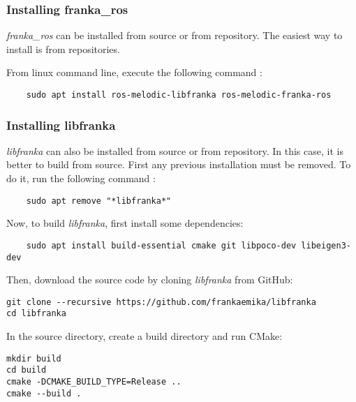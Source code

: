 \subsubsection*{Installing franka\_ros}
\label{subsubsec:ros_setup_robotic_system_integration_ros_installation_franka_ros}

\textit{franka\_ros} can be installed from source or from repository. The easiest way to install is from repositories.

From linux command line, execute the following command \cite{FrankaEmikaGmbH_fci_documentation}:

\begin{verbatim}
    sudo apt install ros-melodic-libfranka ros-melodic-franka-ros
\end{verbatim}


\subsubsection*{Installing libfranka}
\label{subsubsec:ros_setup_robotic_system_integration_ros_installation_libfranka}

\textit{libfranka} can also be installed from source or from repository. In this case, it is better to build from source. 
First any previous installation must be removed. To do it, run the following command \cite{FrankaEmikaGmbH_fci_documentation}:

\begin{verbatim}
    sudo apt remove "*libfranka*"
\end{verbatim}

Now, to build \textit{libfranka}, first install some dependencies:

\begin{verbatim}
    sudo apt install build-essential cmake git libpoco-dev libeigen3-dev
\end{verbatim}

Then, download the source code by cloning \textit{libfranka} from GitHub:

\begin{verbatim}
git clone --recursive https://github.com/frankaemika/libfranka
cd libfranka
\end{verbatim}

In the source directory, create a build directory and run CMake:

\begin{verbatim}
mkdir build
cd build
cmake -DCMAKE_BUILD_TYPE=Release ..
cmake --build .
\end{verbatim}

